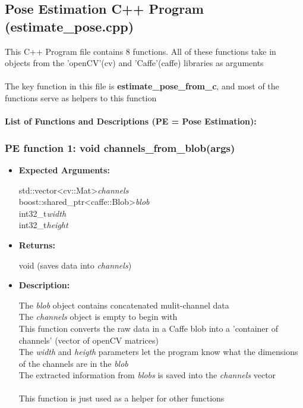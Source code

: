 \documentclass{scrreprt}
\begin{document}
\subsection{Pose Estimation C++ Program (estimate\_pose.cpp)}

This C++ Program file contains 8 functions. All of these functions take in objects from the 'openCV'(cv) and 'Caffe'(caffe) libraries as arguments
\\\\
The key function in this file is \textbf{estimate\_pose\_from\_c}, and most of the functions serve as helpers to this function
\\\\
\textbf{List of Functions and Descriptions (PE = Pose Estimation):}
\\
\subsubsection{PE function 1: void channels\_from\_blob(args)}
\begin{itemize}
    \item \textbf{Expected Arguments:}

    std::vector\textless cv::Mat\textgreater\quad\textit{channels}
    \\
    boost::shared\_ptr\textless caffe::Blob\textgreater\quad\textit{blob}
    \\
    int32\_t\quad\textit{width}
    \\
    int32\_t\quad\textit{height}

    \item \textbf{Returns:}

    void (saves data into \textit{channels})

    \item \textbf{Description:}

    The \textit{blob} object contains concatenated mulit-channel data
    \\
    The \textit{channels} object is empty to begin with
    \\
    This function converts the raw data in a Caffe blob into a 'container of channels' (vector of openCV matrices)
    \\
    The \textit{width} and \textit{heigth} parameters let the program know what the dimensions of the channels are in the \textit{blob}
    \\
    The extracted information from \textit{blobs} is saved into the \textit{channels} vector
    \\\\
    This function is just used as a helper for other functions
\end{itemize}
\end{document}
